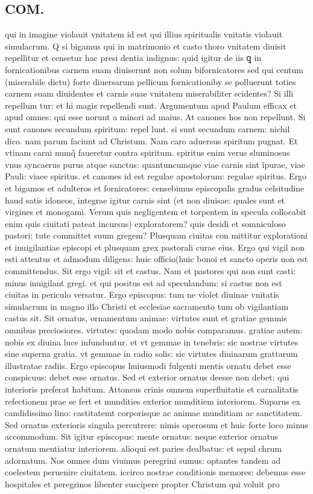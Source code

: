 \documentclass{article}
\begin{document}
\begin{pages}
\section*{COM. }
\marginpar{[ p.3 ]}\pstart qui in imagine violauit vnitatem id est qui illius spiritualis vnitatis violauit simulacrum. Q si bigamus qui in matrimonio et casto thoro vnitatem diuisit repellitur et censetur hac presi dentia indignus: quid igitur de iis ꝗ in fornicationibus carnem suam diuiserunt non solum bifornicatores sed qui centum (miserabile dictu) forte diuersarum pellicum fornicationiby se polluerunt toties carnem suam diuidentes et carnis suae vnitatem miserabiliter scidentes? Si illi repellum tur: et hi magis repellendi sunt. Argumentum apud Paulum efficax et apud omnes: qui esse norunt a minori ad maius. At canones hos non repellunt. Si sunt canones secundum spiritum: repel lunt. si sunt secundum carnem: nichil dico. nam parum faciunt ad Christum. Nam caro aduersus spiritum pugnat. Et vtinam carni numq̃ faueretur contra spiritum. spiritus enim verus sluminosus vnus syncaerus purus atque sanctus: quantuncumque viae carnis sint ĩpurae, viae Pauli: viaee spiritus. et canones id est regulae apostolorum: regulae spiritus. Ergo et bigamos et adulteros et fornicatores: censebimus episcopalis gradus celsitudine haud satis idoneos, integrae igitur carnis sint (et non diuisae: quales sunt et virgines et monogami. Verum quis negligentem et torpentem in specula collocabit enim quis ciuitati pateat incursus) exploratorem? quis desidi et somniculoso pastori: tute committet suum gregem? Plusquam ciuitas con mittitur explorationi et inuigilantiae episcopi et plusquam grex pastorali curae eius. Ergo qui vigil non esti attentus et admodum diligens: huic officio(huic bonoi et sancto operis non est committendus. Sit ergo vigil: sit et castus. Nam et pastores qui non sunt casti: minus inuigilant gregi. et qui positus est ad speculandum: si castus non est ciuitas in periculo versatur. Ergo episcopus: tum ne violet diuinae vnitatis simulacrum in magno illo Christi et ecclesiae sacramento tum ob vigilantiam castus sit. Sit ornatus, ornamentum animae: virtutes sunt et gratiae gemmis omnibus preciosiores. virtutes: quodam modo nobis comparamus. gratiae autem: nobis ex diuina luce infunduntur. et vt gemmae in tenebris: sic nostrae virtutes sine superna gratia. vt gemmae in radio solis: sic virtutes diuinarum grattarum illustratae radiis. Ergo episcopus huiusmodi fulgenti mentis ornatu debet esse conspicuus: debet esse ornatus. Sed et exterior ornatus deesse non debet: qui interioris preferat habitum. Attonsus crinis omnem superfluitatis et carnalitatis refectionem prae se fert et mundities exterior munditiem interiorem. Suparus ex candidissimo lino: castitatemt corporisque  ac animae munditiam ac sanctitatem. Sed ornatus exterioris singula percutrere: nimis operosum et huic forte loco minus accommodum. Sit igitur episcopus: mente ornatus: neque exterior ornatus ornatum mentiatur interiorem. alioqui est paries dealbatus: et sepul chrum adornatum. Nos omnes dum viuimus peregrini sumus: optantes tandem ad coelestem peruenire ciuitatem. iccirco nostrae conditionis memores: debemus esse hospitales et peregrinos libenter suscipere propter Christum qui voluit pro 
\end{pages}
\end{document}
